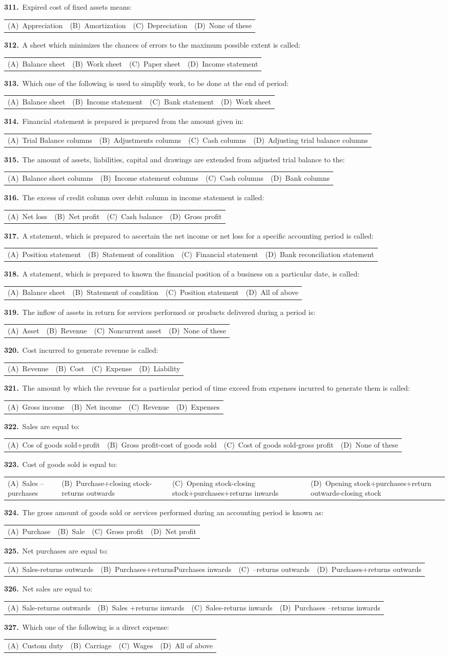 \documentclass[11pt,a4paper]{article}
\makeatletter
\newcommand{\mcq}[6]{%
  \Needspace{4\baselineskip}%
  \par\medskip\noindent\textbf{#1.}\ #2\par\nopagebreak
  \noindent\begin{tabularx}{\linewidth}{@{\hspace{1.5em}}*{4}{>{\raggedright\arraybackslash}X}@{}}
    (A)~#3 & (B)~#4 & (C)~#5 & (D)~#6
  \end{tabularx}\par}
\makeatother
\begin{document}
\mcq{311}{Expired cost of fixed assets means:}{Appreciation}{Amortization}{Depreciation}{None of these}
\mcq{312}{A sheet which minimizes the chances of errors to the maximum possible extent is called:}{Balance sheet}{Work sheet}{Paper sheet}{Income statement}
\mcq{313}{Which one of the following is used to simplify work, to be done at the end of period:}{Balance sheet}{Income statement}{Bank statement}{Work sheet}
\mcq{314}{Financial statement is prepared is prepared from the amount given in:}{Trial Balance columns}{Adjustments columns}{Cash columns}{Adjusting trial balance columns}
\mcq{315}{The amount of assets, liabilities, capital and drawings are extended from adjusted trial balance to the:}{Balance sheet columns}{Income statement columns}{Cash columns}{Bank columns}
\mcq{316}{The excess of credit column over debit column in income statement is called:}{Net loss}{Net profit}{Cash balance}{Gross profit}
\mcq{317}{A statement, which is prepared to ascertain the net income or net loss for a specific accounting period is called:}{Position statement}{Statement of condition}{Financial statement}{Bank reconciliation statement}
\mcq{318}{A statement, which is prepared to known the financial position of a business on a particular date, is called:}{Balance sheet}{Statement of condition}{Position statement}{All of above}
\mcq{319}{The inflow of assets in return for services performed or products delivered during a period is:}{Asset}{Revenue}{Noncurrent asset}{None of these}
\mcq{320}{Cost incurred to generate revenue is called:}{Revenue}{Cost}{Expense}{Liability}
\mcq{321}{The amount by which the revenue for a particular period of time exceed from expenses incurred to generate them is called:}{Gross income}{Net income}{Revenue}{Expenses}
\mcq{322}{Sales are equal to:}{Cos of goods sold+profit}{Gross profit-cost of goods sold}{Cost of goods sold-gross profit}{None of these}
\mcq{323}{Cost of goods sold is equal to:}{Sales –purchases}{Purchase+closing stock-returns outwards}{Opening stock-closing stock+purchases+returns inwards}{Opening stock+purchases+return outwards-closing stock}
\mcq{324}{The gross amount of goods sold or services performed during an accounting period is known as:}{Purchase}{Sale}{Gross profit}{Net profit}
\mcq{325}{Net purchases are equal to:}{Sales-returns outwards}{Purchases+returnsPurchases inwards}{–returns outwards}{Purchases+returns outwards}
\mcq{326}{Net sales are equal to:}{Sale-returns outwards}{Sales +returns inwards}{Sales-returns inwards}{Purchases –returns inwards}
\mcq{327}{Which one of the following is a direct expense:}{Custom duty}{Carriage}{Wages}{All of above}
\end{document}
